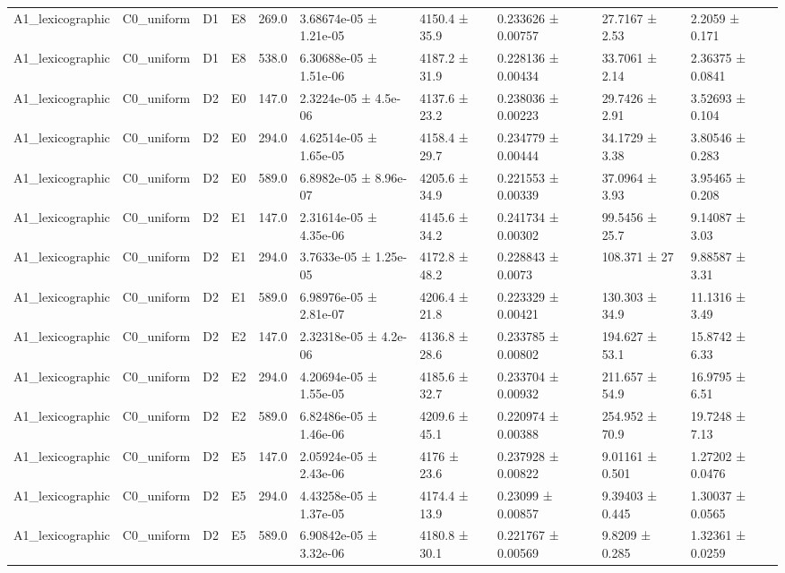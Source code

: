 \begin{table}
\begin{tabular}{llllllllll}
A1\_lexicographic & C0\_uniform & D1 & E8 & 269.0 & 3.68674e-05 ± 1.21e-05 & 4150.4 ± 35.9 & 0.233626 ± 0.00757 & 27.7167 ± 2.53 & 2.2059 ± 0.171 \\
A1\_lexicographic & C0\_uniform & D1 & E8 & 538.0 & 6.30688e-05 ± 1.51e-06 & 4187.2 ± 31.9 & 0.228136 ± 0.00434 & 33.7061 ± 2.14 & 2.36375 ± 0.0841 \\
A1\_lexicographic & C0\_uniform & D2 & E0 & 147.0 & 2.3224e-05 ± 4.5e-06 & 4137.6 ± 23.2 & 0.238036 ± 0.00223 & 29.7426 ± 2.91 & 3.52693 ± 0.104 \\
A1\_lexicographic & C0\_uniform & D2 & E0 & 294.0 & 4.62514e-05 ± 1.65e-05 & 4158.4 ± 29.7 & 0.234779 ± 0.00444 & 34.1729 ± 3.38 & 3.80546 ± 0.283 \\
A1\_lexicographic & C0\_uniform & D2 & E0 & 589.0 & 6.8982e-05 ± 8.96e-07 & 4205.6 ± 34.9 & 0.221553 ± 0.00339 & 37.0964 ± 3.93 & 3.95465 ± 0.208 \\
A1\_lexicographic & C0\_uniform & D2 & E1 & 147.0 & 2.31614e-05 ± 4.35e-06 & 4145.6 ± 34.2 & 0.241734 ± 0.00302 & 99.5456 ± 25.7 & 9.14087 ± 3.03 \\
A1\_lexicographic & C0\_uniform & D2 & E1 & 294.0 & 3.7633e-05 ± 1.25e-05 & 4172.8 ± 48.2 & 0.228843 ± 0.0073 & 108.371 ± 27 & 9.88587 ± 3.31 \\
A1\_lexicographic & C0\_uniform & D2 & E1 & 589.0 & 6.98976e-05 ± 2.81e-07 & 4206.4 ± 21.8 & 0.223329 ± 0.00421 & 130.303 ± 34.9 & 11.1316 ± 3.49 \\
A1\_lexicographic & C0\_uniform & D2 & E2 & 147.0 & 2.32318e-05 ± 4.2e-06 & 4136.8 ± 28.6 & 0.233785 ± 0.00802 & 194.627 ± 53.1 & 15.8742 ± 6.33 \\
A1\_lexicographic & C0\_uniform & D2 & E2 & 294.0 & 4.20694e-05 ± 1.55e-05 & 4185.6 ± 32.7 & 0.233704 ± 0.00932 & 211.657 ± 54.9 & 16.9795 ± 6.51 \\
A1\_lexicographic & C0\_uniform & D2 & E2 & 589.0 & 6.82486e-05 ± 1.46e-06 & 4209.6 ± 45.1 & 0.220974 ± 0.00388 & 254.952 ± 70.9 & 19.7248 ± 7.13 \\
A1\_lexicographic & C0\_uniform & D2 & E5 & 147.0 & 2.05924e-05 ± 2.43e-06 & 4176 ± 23.6 & 0.237928 ± 0.00822 & 9.01161 ± 0.501 & 1.27202 ± 0.0476 \\
A1\_lexicographic & C0\_uniform & D2 & E5 & 294.0 & 4.43258e-05 ± 1.37e-05 & 4174.4 ± 13.9 & 0.23099 ± 0.00857 & 9.39403 ± 0.445 & 1.30037 ± 0.0565 \\
A1\_lexicographic & C0\_uniform & D2 & E5 & 589.0 & 6.90842e-05 ± 3.32e-06 & 4180.8 ± 30.1 & 0.221767 ± 0.00569 & 9.8209 ± 0.285 & 1.32361 ± 0.0259 \\

\end{tabular}
\end{table}
